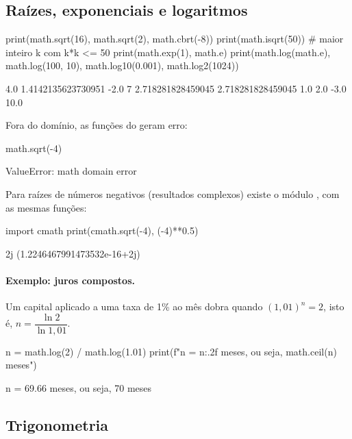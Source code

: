 \subsection{Raízes, exponenciais e logaritmos}

\begin{entrada}
print(math.sqrt(16), math.sqrt(2), math.cbrt(-8))
print(math.isqrt(50))                 # maior inteiro k com k*k <= 50
print(math.exp(1), math.e)
print(math.log(math.e), math.log(100, 10), math.log10(0.001), math.log2(1024))
\end{entrada}
\begin{saida}
4.0 1.4142135623730951 -2.0
7
2.718281828459045 2.718281828459045
1.0 2.0 -3.0 10.0
\end{saida}

Fora do domínio, as funções do  geram erro:

\begin{entrada}
math.sqrt(-4)
\end{entrada}
\begin{saida}
ValueError: math domain error
\end{saida}

Para raízes de números negativos (resultados complexos) existe o módulo , com as mesmas funções:

\begin{entrada}
import cmath
print(cmath.sqrt(-4), (-4)**0.5)
\end{entrada}
\begin{saida}
2j (1.2246467991473532e-16+2j)
\end{saida}

\paragraph{Exemplo: juros compostos.} Um capital aplicado a uma taxa de 1\% ao mês dobra quando $(1{,}01)^n=2$,
isto é, $n=\dfrac{\ln 2}{\ln 1{,}01}$.

\begin{entrada}
n = math.log(2) / math.log(1.01)
print(f"n = {n:.2f} meses, ou seja, {math.ceil(n)} meses")
\end{entrada}
\begin{saida}
n = 69.66 meses, ou seja, 70 meses
\end{saida}

\subsection{Trigonometria}

